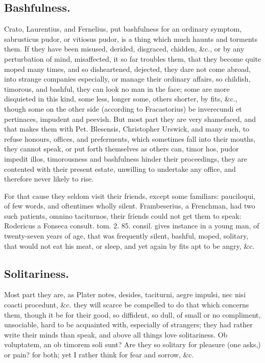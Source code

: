 {\subsection{Bashfulness.}
Crato, Laurentius, and Fernelius, put
bashfulness for an ordinary symptom, sabrusticus pudor, or vitiosus
pudor, is a thing which much haunts and torments them. If they have
been misused, derided, disgraced, chidden, \&c., or by any perturbation
of mind, misaffected, it so far troubles them, that they become quite
moped many times, and so disheartened, dejected, they dare not come
abroad, into strange companies especially, or manage their ordinary
affairs, so childish, timorous, and bashful, they can look no man in
the face; some are more disquieted in this kind, some less, longer
some, others shorter, by fits, \&c., though some on the other side
(according to Fracastorius) be inverecundi et pertinaces,
impudent and peevish. But most part they are very shamefaced, and that
makes them with Pet. Blesensis, Christopher Urswick, and many such, to
refuse honours, offices, and preferments, which sometimes fall into
their mouths, they cannot speak, or put forth themselves as others can,
timor hos, pudor impedit illos, timorousness and bashfulness hinder
their proceedings, they are contented with their present estate,
unwilling to undertake any office, and therefore never likely to rise.

For that cause they seldom visit their friends, except some familiars:
pauciloqui, of few words, and oftentimes wholly silent. 
Frambeserius, a Frenchman, had two such patients, omnino taciturnos,
their friends could not get them to speak: Rodericus a Fonseca consult.
tom. 2. 85. consil. gives instance in a young man, of twenty-seven
years of age, that was frequently silent, bashful, moped, solitary,
that would not eat his meat, or sleep, and yet again by fits apt to be
angry, \&c.

\subsection{Solitariness.}
Most part they are, as Plater notes, desides,
taciturni, aegre impulsi, nec nisi coacti procedunt, \&c. they will
scarce be compelled to do that which concerns them, though it be for
their good, so diffident, so dull, of small or no compliment,
unsociable, hard to be acquainted with, especially of strangers; they
had rather write their minds than speak, and above all things love
solitariness. Ob voluptatem, an ob timorem soli sunt? Are they so
solitary for pleasure (one asks,) or pain? for both; yet I rather think
for fear and sorrow, \&c.

}
